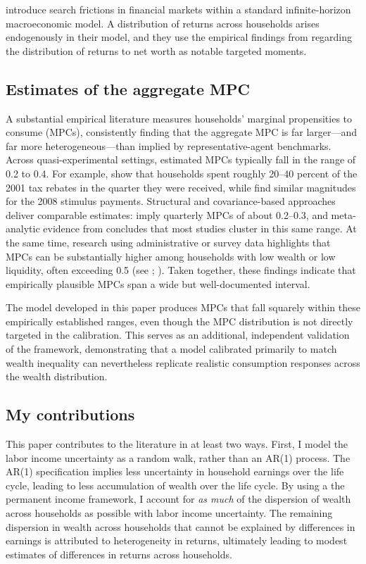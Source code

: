 \par \cite{Menzio2025} introduce search frictions in financial markets within a standard infinite-horizon macroeconomic model. A distribution of returns across households arises endogenously in their model, and they use the empirical findings from \cite{aflgdmlp20} regarding the distribution of returns to net worth as notable targeted moments.

\subsection{Estimates of the aggregate MPC}


A substantial empirical literature measures households' marginal propensities to consume (MPCs), consistently finding that the aggregate MPC is far larger---and far more heterogeneous---than implied by representative-agent benchmarks. Across quasi-experimental settings, estimated MPCs typically fall in the range of 0.2 to 0.4. For example, \cite{Johnson2006} show that households spent roughly 20--40 percent of the 2001 tax rebates in the quarter they were received, while \cite{Parker2013} find similar magnitudes for the 2008 stimulus payments. Structural and covariance-based approaches deliver comparable estimates: \cite{Blundell2008} imply quarterly MPCs of about 0.2--0.3, and meta-analytic evidence from \cite{Havranek2020} concludes that most studies cluster in this same range. At the same time, research using administrative or survey data highlights that MPCs can be substantially higher among households with low wealth or low liquidity, often exceeding 0.5 (see \cite{Jappelli2014}; \cite{Fagereng2021}). Taken together, these findings indicate that empirically plausible MPCs span a wide but well-documented interval.

\par The model developed in this paper produces MPCs that fall squarely within these empirically established ranges, even though the MPC distribution is not directly targeted in the calibration. This serves as an additional, independent validation of the framework, demonstrating that a model calibrated primarily to match wealth inequality can nevertheless replicate realistic consumption responses across the wealth distribution. 

\subsection{My contributions}

\par This paper contributes to the literature in at least two ways. First, I  model the labor income uncertainty as a random walk, rather than an AR(1) process. The AR(1) specification implies less uncertainty in household earnings over the life cycle, leading to less accumulation of wealth over the life cycle. By using a the permanent income framework, I account for \textit{as much} of the dispersion of wealth across households as possible with labor income uncertainty. The remaining dispersion in wealth across households that cannot be explained by differences in earnings is attributed to heterogeneity in returns, ultimately leading to modest estimates of differences in returns across households.

